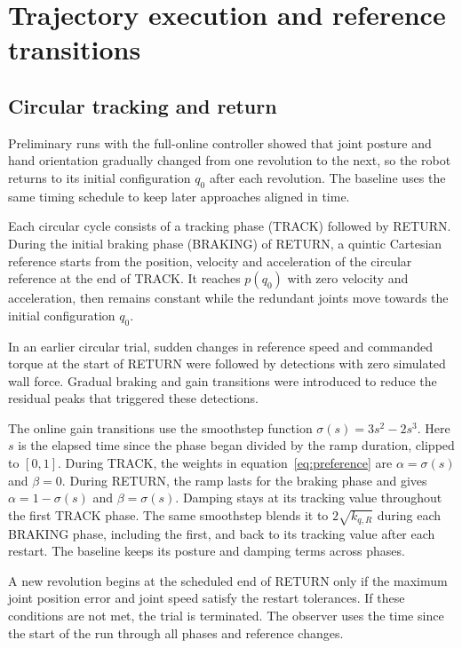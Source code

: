 \documentclass[11pt,a4paper]{article}
\begin{document}
\section{Trajectory execution and reference transitions}
\label{sec:return}

\subsection{Circular tracking and return}
Preliminary runs with the full-online controller showed that joint posture
and hand orientation gradually changed from one revolution to the next,
so the robot returns to its initial configuration $q_0$ after each
revolution. The baseline uses the same timing schedule to keep later
approaches aligned in time.

Each circular cycle consists of a tracking phase (TRACK) followed by
RETURN. During the initial braking phase (BRAKING) of RETURN, a
quintic Cartesian reference starts from the position, velocity and
acceleration of the circular reference at the end of TRACK. It reaches
$p(q_0)$ with zero velocity and acceleration, then remains constant while
the redundant joints move towards the initial configuration $q_0$.

In an earlier circular trial, sudden changes in reference speed and
commanded torque at the start of RETURN were followed by detections with
zero simulated wall force. Gradual braking and gain transitions were
introduced to reduce the residual peaks that triggered these detections.

The online gain transitions use the smoothstep function
$\sigma(s)=3s^2-2s^3$. Here $s$ is the elapsed time since the phase
began divided by the ramp duration, clipped to $[0,1]$.
During TRACK, the weights in equation~\eqref{eq:preference} are
$\alpha=\sigma(s)$ and $\beta=0$. During RETURN, the ramp lasts for
the braking phase and gives $\alpha=1-\sigma(s)$ and $\beta=\sigma(s)$.
Damping stays at its tracking value throughout the first TRACK phase.
The same smoothstep blends it to $2\sqrt{k_{q,R}}$ during each BRAKING
phase, including the first, and back to its tracking value after each
restart. The baseline keeps its posture and damping terms across phases.

A new revolution begins at the scheduled end of RETURN only if the
maximum joint position error and joint speed satisfy the restart
tolerances. If these conditions are not met, the trial is
terminated. The observer uses the time since the start of the run through
all phases and reference changes.
\end{document}
